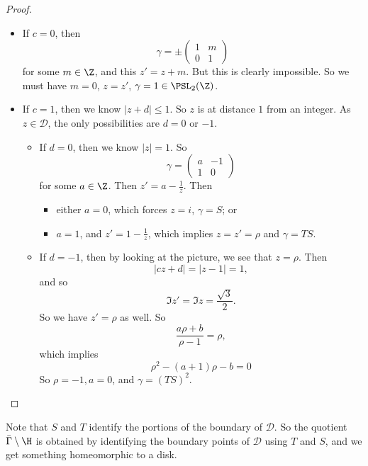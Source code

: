 \documentclass[a4paper]{article}
\begin{document}
\begin{proof}
  \begin{itemize}
    \item If $c = 0$, then
      \[
        \gamma = \pm
        \begin{pmatrix}
          1 & m\\
          0 & 1
        \end{pmatrix}
      \]
      for some $m \in \Z$, and this $z' = z + m$. But this is clearly impossible. So we must have $m = 0$, $z = z'$, $\gamma = 1 \in \PSL_2(\Z)$.

    \item If $c = 1$, then we know $|z + d| \leq 1$. So $z$ is at distance $1$ from an integer. As $z \in \mathcal{D}$, the only possibilities are $d = 0$ or $-1$.

      \begin{itemize}
        \item If $d = 0$, then we know $|z| = 1$. So
          \[
            \gamma =
            \begin{pmatrix}
              a & -1\\
              1 & 0
            \end{pmatrix}
          \]
          for some $a \in \Z$. Then $z' = a - \frac{1}{z}$. Then
          \begin{itemize}
            \item either $a = 0$, which forces $z = i$, $\gamma = S$; or
            \item $a = 1$, and $z' = 1 - \frac{1}{z}$, which implies $z = z' = \rho$ and $\gamma = TS$.
          \end{itemize}
        \item If $d = -1$, then by looking at the picture, we see that $z = \rho$. Then
          \[
            |cz + d| = |z - 1| = 1,
          \]
          and so
          \[
            \Im z' = \Im z = \frac{\sqrt{3}}{2}.
          \]
          So we have $z' = \rho$ as well. So
          \[
            \frac{a \rho + b}{\rho - 1} = \rho,
          \]
          which implies
          \[
            \rho^2 - (a + 1) \rho - b = 0
          \]
          So $\rho = -1, a = 0$, and $\gamma = (TS)^2$.
      \end{itemize}
  \end{itemize}
\end{proof}

Note that $S$ and $T$ identify the portions of the boundary of $\mathcal{D}$. So the quotient $\bar{\Gamma}\setminus \H$ is obtained by identifying the boundary points of $\mathcal{D}$ using $T$ and $S$, and we get something homeomorphic to a disk.
\end{document}
